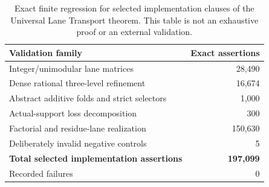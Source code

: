\begin{table}[htbp]
\centering
\small
\caption{Exact finite regression for selected implementation clauses of the Universal Lane Transport theorem. This table is not an exhaustive proof or an external validation.}
\label{tab:block15-lane-transport-validation}
\begin{tabularx}{\textwidth}{@{}Y r@{}}
\toprule
Validation family & Exact assertions \\
\midrule
Integer/unimodular lane matrices & 28,490 \\
Dense rational three-level refinement & 16,674 \\
Abstract additive folds and strict selectors & 1,000 \\
Actual-support loss decomposition & 300 \\
Factorial and residue-lane realization & 150,630 \\
Deliberately invalid negative controls & 5 \\
\midrule
\textbf{Total selected implementation assertions} & \textbf{197,099} \\
Recorded failures & 0 \\
\bottomrule
\end{tabularx}
\end{table}
